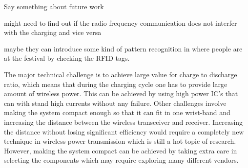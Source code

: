 Say something about future work

might need to find out if the radio frequency communication does not interfer with the charging and vice versa

maybe they can introduce some kind of pattern recognition in where people are at the festival by checking the RFID tags. 


The major technical challenge is to achieve large value for charge to discharge ratio, which means that during the charging cycle one has to provide large amount of wireless power. This can be achieved by using high power IC's that can with stand high currents without any failure. 
Other challenges involve making the system compact enough so that it can fit in one wrist-band and increasing the distance between the wireless transceiver and receiver. Increasing the distance without losing significant efficiency would require a completely new technique in wireless power transmission which is still a hot topic of research. However, making the system compact can be achieved by taking extra care in selecting the components which may require exploring many different vendors.